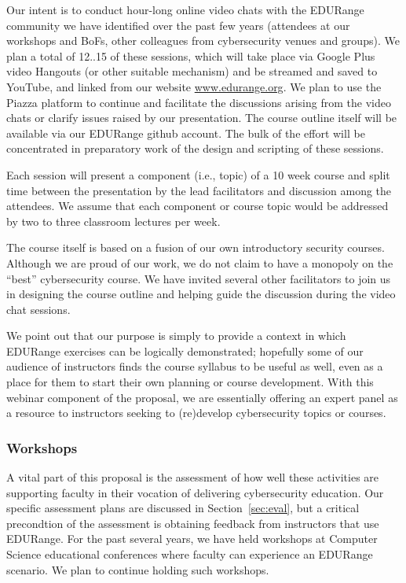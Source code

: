Our intent is to conduct hour-long online video chats with the
EDURange community we have identified over the past few years
(attendees at our workshops and BoFs, other colleagues from
cybersecurity venues and groups).  We plan a total of 12..15 of these
sessions, which will take place via Google Plus video Hangouts (or
other suitable mechanism) and be streamed and saved to YouTube, and
linked from our website \url{www.edurange.org}.  We plan to use the
Piazza platform to continue and facilitate the discussions arising
from the video chats or clarify issues raised by our presentation. The
course outline itself will be available via our EDURange github
account.  The bulk of the effort will be concentrated in preparatory
work of the design and scripting of these sessions.

Each session will present a component (i.e., topic) of a 10 week
course and split time between the presentation by the lead
facilitators and discussion among the attendees.  We assume that each
component or course topic would be addressed by two to three classroom
lectures per week.

The course itself is based on a fusion of our own introductory
security courses.  Although we are proud of our work, we do not claim
to have a monopoly on the ``best'' cybersecurity course.  We have
invited several other facilitators to join us in designing the course
outline and helping guide the discussion during the video chat
sessions.

 \hskip 0.1in We point out
that our purpose is simply to provide a context in which EDURange
exercises can be logically demonstrated; hopefully some of our
audience of instructors finds the course syllabus to be useful as
well, even as a place for them to start their own planning or course
development.  With this webinar component of the proposal, we are
essentially offering an expert panel as a resource to instructors
seeking to (re)develop cybersecurity topics or courses.

\subsubsection{Workshops}

A vital part of this proposal is the assessment of how well these
activities are supporting faculty in their vocation of delivering
cybersecurity education.  Our specific assessment plans are discussed
in Section~\ref{sec:eval}, but a critical precondtion of the
assessment is obtaining feedback from instructors that use EDURange.
For the past several years, we have held workshops at Computer Science
educational conferences where faculty can experience an EDURange
scenario.  We plan to continue holding such workshops.

